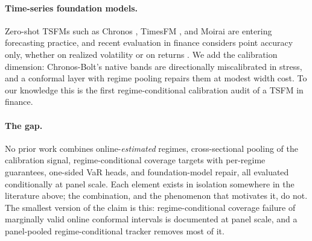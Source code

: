 \paragraph{Time-series foundation models.}
Zero-shot TSFMs such as Chronos \citep{ansari2024chronos}, TimesFM
\citep{das2024decoder}, and Moirai \citep{woo2024unified} are entering
forecasting practice, and recent evaluation in finance considers point
accuracy only, whether on realized volatility
\citep{brini2026forecasting} or on returns
\citep{noguer2026pretrained}. We add the
calibration dimension: Chronos-Bolt's native bands are directionally
miscalibrated in stress, and a conformal layer with regime pooling repairs
them at modest width cost. To our knowledge this is the first
regime-conditional calibration audit of a TSFM in finance.

\paragraph{The gap.}
No prior work combines online-\emph{estimated} regimes,
cross-sectional pooling of the calibration signal, regime-conditional
coverage targets with per-regime guarantees, one-sided VaR heads, and
foundation-model repair, all evaluated conditionally at panel scale. Each
element exists in isolation somewhere in the literature above; the
combination, and the phenomenon that motivates it, do not. The smallest
version of the claim is this: regime-conditional coverage failure of
marginally valid online conformal intervals is documented at panel scale,
and a panel-pooled regime-conditional tracker removes most of it.
